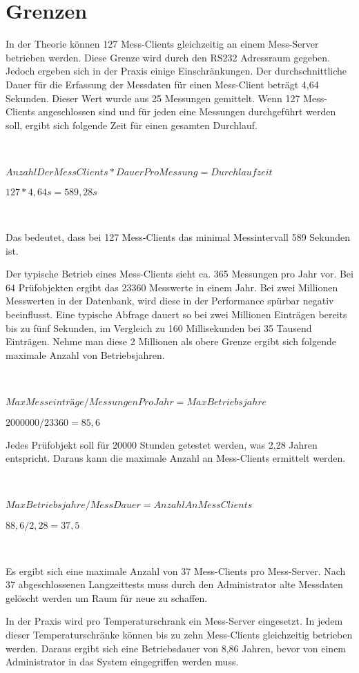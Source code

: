 \section{Grenzen}

In der Theorie können 127 Mess-Clients gleichzeitig an einem Mess-Server betrieben werden. Diese Grenze wird durch den RS232 Adressraum gegeben. Jedoch ergeben sich in der Praxis einige Einschränkungen. Der durchschnittliche Dauer für die Erfassung der Messdaten für einen Mess-Client beträgt 4,64 Sekunden. Dieser Wert wurde aus 25 Messungen gemittelt. Wenn 127 Mess-Clients angeschlossen sind und für jeden eine Messungen durchgeführt werden soll, ergibt sich folgende Zeit für einen gesamten Durchlauf.\ 

\ 
\begin{center}
{\large$AnzahlDerMessClients * DauerProMessung = Durchlaufzeit$}\ 


{\large$127 * 4,64 s = 589,28 s$}
\end{center}\ 

Das bedeutet, dass bei 127 Mess-Clients das minimal Messintervall 589 Sekunden ist.\ 

Der typische Betrieb eines Mess-Clients sieht ca. 365 Messungen pro Jahr vor. Bei 64 Prüfobjekten ergibt das 23360 Messwerte in einem Jahr. Bei zwei Millionen Messwerten in der Datenbank, wird diese in der Performance spürbar negativ beeinflusst. Eine typische Abfrage dauert so bei zwei Millionen Einträgen bereits bis zu fünf Sekunden, im Vergleich zu 160 Millisekunden bei 35 Tausend Einträgen. Nehme man diese 2 Millionen als obere Grenze ergibt sich folgende maximale Anzahl von Betriebsjahren.

\ 
\begin{center}
{\large$MaxMesseinträge / MessungenProJahr = MaxBetriebsjahre$}\ 


{\large$2000000 / 23360 = 85,6$}
\end{center}
Jedes Prüfobjekt soll für 20000 Stunden getestet werden, was 2,28 Jahren entspricht. Daraus kann die maximale Anzahl an Mess-Clients ermittelt werden.\ 

\ 
\begin{center}
{\large$MaxBetriebsjahre / MessDauer = AnzahlAnMessClients$}\ 


{\large$88,6 / 2,28 = 37,5$}
\end{center}\ 

Es ergibt sich eine maximale Anzahl von 37 Mess-Clients pro Mess-Server. Nach 37 abgeschlossenen Langzeittests muss durch den Administrator alte Messdaten gelöscht werden um Raum für neue zu schaffen.\ 

In der Praxis wird pro Temperaturschrank ein Mess-Server eingesetzt. In jedem dieser Temperaturschränke können bis zu zehn Mess-Clients gleichzeitig betrieben werden. Daraus ergibt sich eine Betriebsdauer von 8,86 Jahren, bevor von einem Administrator in das System eingegriffen werden muss.
